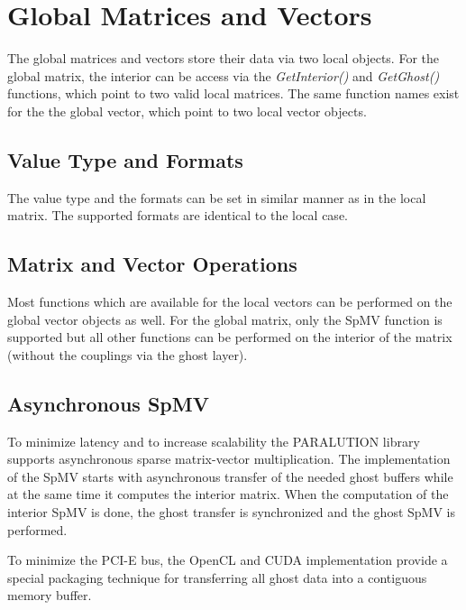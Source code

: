 \section{Global Matrices and Vectors}

The global matrices and vectors store their data via two local objects. For the global matrix, the interior can be access via the \emph{GetInterior()} and \emph{GetGhost()} functions, which point to two valid local matrices. The same function names exist for the the global vector, which point to two local vector objects.

\subsection{Value Type and Formats}

The value type and the formats can be set in similar manner as in the local matrix. The supported formats are identical to the local case.

\subsection{Matrix and Vector Operations}

Most functions which are available for the local vectors can be performed on the global vector objects as well. For the global matrix, only the SpMV function is supported but all other functions can be performed on the interior of the matrix (without the couplings via the ghost layer).

\subsection{Asynchronous SpMV}

To minimize latency and to increase scalability the PARALUTION library supports asynchronous sparse matrix-vector multiplication. The implementation of the SpMV starts with asynchronous transfer of the needed ghost buffers while at the same time it computes the interior matrix. When the computation of the interior SpMV is done, the ghost transfer is synchronized and the ghost SpMV is performed.

To minimize the PCI-E bus, the OpenCL and CUDA implementation provide a special packaging technique for transferring all ghost data into a contiguous memory buffer.


